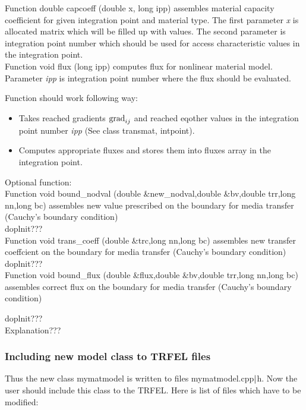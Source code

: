 Function {\sf double capcoeff (double x, long ipp)} assembles material capacity coefficient for given
integration point and material type. The first parameter {\it x} is allocated matrix which will be
filled up with values. The second parameter is integration point number which should be used for
access characteristic values in the integration point.\\

Function {\sf void flux (long ipp)} computes flux for nonlinear material model. Parameter
{\it ipp} is integration point number where the flux should be evaluated.

Function should work following way:
\begin{itemize}
\item
Takes reached gradients ${\rm grad}_{ij}$ and reached {\sf eqother} values in the integration point number
{\it ipp} (See class {\sf transmat, intpoint}). 
\item
Computes appropriate fluxes and stores them into fluxes array in the integration point.
\end{itemize}

Optional function:\\

Function {\sf void bound\_nodval (double \&new\_nodval,double \&bv,double trr,long nn,long bc)}
assembles new value prescribed on the boundary for media transfer (Cauchy's boundary condition)\\

doplnit???\\

Function {\sf void trans\_coeff (double \&trc,long nn,long bc)}
assembles new transfer coeffcient on the boundary for media transfer (Cauchy's boundary condition)\\

 
doplnit???\\

Function {\sf void bound\_flux (double \&flux,double \&bv,double trr,long nn,long bc)}
assembles correct flux on the boundary for media transfer (Cauchy's boundary condition)

doplnit???\\


Explanation???\\


\subsubsection {Including new model class to TRFEL files}
Thus the new class {\sf mymatmodel} is written to files  mymatmodel.cpp${\rm |}$h. Now the user should
include this class to the TRFEL. Here is list of files which have to be modified:\\

